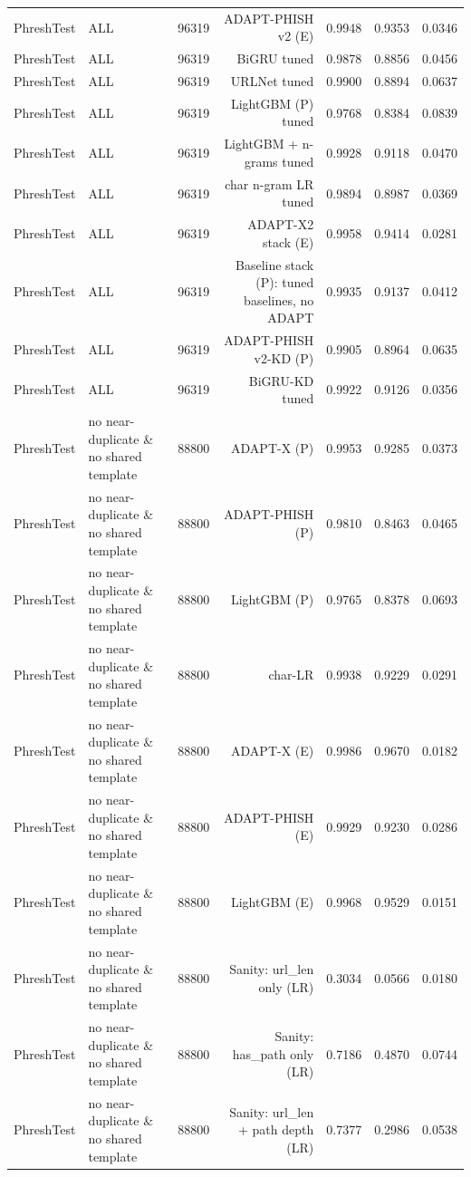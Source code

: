 \begin{table}[t]
\begin{tabular}{llrrrrr}
PhreshTest & ALL & 96319 & ADAPT-PHISH v2 (E) & 0.9948 & 0.9353 & 0.0346 \\
PhreshTest & ALL & 96319 & BiGRU tuned & 0.9878 & 0.8856 & 0.0456 \\
PhreshTest & ALL & 96319 & URLNet tuned & 0.9900 & 0.8894 & 0.0637 \\
PhreshTest & ALL & 96319 & LightGBM (P) tuned & 0.9768 & 0.8384 & 0.0839 \\
PhreshTest & ALL & 96319 & LightGBM + n-grams tuned & 0.9928 & 0.9118 & 0.0470 \\
PhreshTest & ALL & 96319 & char n-gram LR tuned & 0.9894 & 0.8987 & 0.0369 \\
PhreshTest & ALL & 96319 & ADAPT-X2 stack (E) & 0.9958 & 0.9414 & 0.0281 \\
PhreshTest & ALL & 96319 & Baseline stack (P): tuned baselines, no ADAPT & 0.9935 & 0.9137 & 0.0412 \\
PhreshTest & ALL & 96319 & ADAPT-PHISH v2-KD (P) & 0.9905 & 0.8964 & 0.0635 \\
PhreshTest & ALL & 96319 & BiGRU-KD tuned & 0.9922 & 0.9126 & 0.0356 \\
PhreshTest & no near-duplicate \& no shared template & 88800 & ADAPT-X (P) & 0.9953 & 0.9285 & 0.0373 \\
PhreshTest & no near-duplicate \& no shared template & 88800 & ADAPT-PHISH (P) & 0.9810 & 0.8463 & 0.0465 \\
PhreshTest & no near-duplicate \& no shared template & 88800 & LightGBM (P) & 0.9765 & 0.8378 & 0.0693 \\
PhreshTest & no near-duplicate \& no shared template & 88800 & char-LR & 0.9938 & 0.9229 & 0.0291 \\
PhreshTest & no near-duplicate \& no shared template & 88800 & ADAPT-X (E) & 0.9986 & 0.9670 & 0.0182 \\
PhreshTest & no near-duplicate \& no shared template & 88800 & ADAPT-PHISH (E) & 0.9929 & 0.9230 & 0.0286 \\
PhreshTest & no near-duplicate \& no shared template & 88800 & LightGBM (E) & 0.9968 & 0.9529 & 0.0151 \\
PhreshTest & no near-duplicate \& no shared template & 88800 & Sanity: url\_len only (LR) & 0.3034 & 0.0566 & 0.0180 \\
PhreshTest & no near-duplicate \& no shared template & 88800 & Sanity: has\_path only (LR) & 0.7186 & 0.4870 & 0.0744 \\
PhreshTest & no near-duplicate \& no shared template & 88800 & Sanity: url\_len + path depth (LR) & 0.7377 & 0.2986 & 0.0538 \\

\end{tabular}
\end{table}
